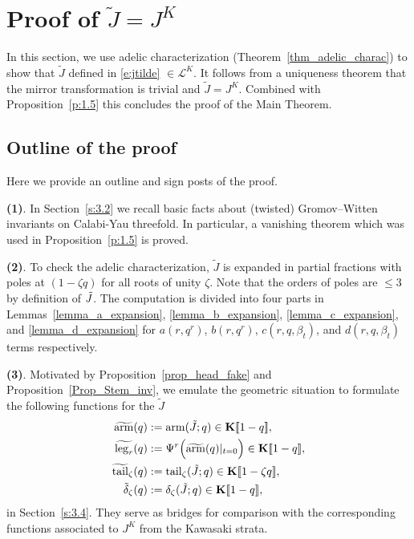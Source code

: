 \documentclass[11pt]{amsart}
\newtheorem*{main theorem*}{Main Theorem}
\theoremstyle{remark}
\numberwithin{equation}{section}
\newcommand{\leg}{{\rm leg}}
\newcommand{\arm}{{\rm arm}}
\newcommand{\tail}{{\rm tail}}
\begin{document}
\section{Proof of $\tilde{J} =J^K$}  \label{s:3} 

In this section, we use adelic characterization (Theorem~\ref{thm_adelic_charac}) to show that $\tilde{J}$ defined in \eqref{e:jtilde} $\in \mathcal{L}^K$. It follows from a uniqueness theorem that the mirror transformation is trivial and $\tilde{J} = J^K$. Combined with Proposition~\ref{p:1.5} this concludes the proof of the Main Theorem.


\subsection{Outline of the proof}
Here we provide an outline and sign posts of the proof.

\textbf{(1)}. In Section~\ref{s:3.2} we recall basic facts about (twisted) Gromov--Witten invariants on Calabi-Yau threefold. In particular, a vanishing theorem which was used in Proposition~\ref{p:1.5} is proved.

\textbf{(2)}. To check the adelic characterization,  $\tilde{J}$ is expanded in partial fractions with poles at $(1-\zeta q)$ for all roots of unity $\zeta$. Note that the orders of poles are $\leq 3$ by definition of $\Tilde{J}$.
The computation is divided into four parts in Lemmas~\ref{lemma_a_expansion}, \ref{lemma_b_expansion}, \ref{lemma_c_expansion}, and \ref{lemma_d_expansion} for $a(r,q^r)$, $b(r,q^r)$, $c(r,q,\beta_t)$, and $d(r,q,\beta_t)$ terms respectively.

\textbf{(3)}. Motivated by Proposition~\ref{prop_head_fake} and Proposition~\ref{Prop_Stem_inv}, we emulate the geometric situation to formulate the following functions for the $\tilde{J}$ 
\[
\begin{split}
    \widetilde{\arm} (q) &:= \arm( \tilde{J}; q ) \in \mathbf{K}[\![ 1-q ]\!],
    \\
    \widetilde{\leg_r}(q) & := \Psi^r \Big( \widetilde{\arm} (q)|_{t=0} \Big) \in \mathbf{K}[\![ 1-q ]\!],
    \\
    \widetilde{\tail}_{\zeta} (q) & := \tail_{\zeta}(\tilde{J};q) \in \mathbf{K}[\![ 1-\zeta q ]\!], \\
    \tilde{\delta}_{\zeta}(q) &:= \delta_{\zeta} ( \tilde{J}; q ) \in \mathbf{K}[\![ 1- q ]\!],
\end{split}
\]
in Section~\ref{s:3.4}. They serve as bridges for comparison with the corresponding functions associated to $J^K$ from the Kawasaki strata.
\end{document}
